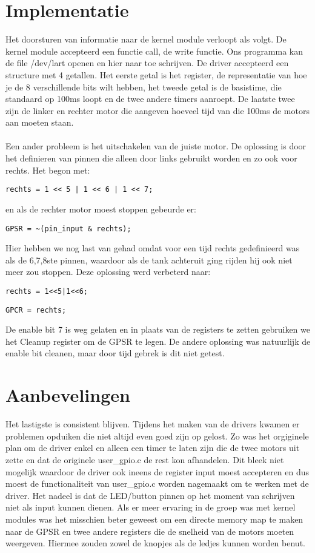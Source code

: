 \documentclass{report}
\begin{document}
\section{Implementatie}
Het doorsturen van informatie naar de kernel module verloopt als volgt. De kernel module accepteerd een functie call, de write functie. Ons programma kan de file /dev/lart openen en hier naar toe schrijven. De driver accepteerd een structure met 4 getallen. Het eerste getal is het register, de representatie van hoe je de 8 verschillende bits wilt hebben, het tweede getal is de basistime, die standaard op 100ms loopt en de twee andere timers aanroept. De laatste twee zijn de linker en rechter motor die aangeven hoeveel tijd van die 100ms de motors aan moeten staan.\\\\
Een ander probleem is het uitschakelen van de juiste motor. De oplossing is door het definieren van pinnen die alleen door links gebruikt worden en zo ook voor rechts. Het begon met:
\begin{lstlisting}
rechts = 1 << 5 | 1 << 6 | 1 << 7;
\end{lstlisting}
en als de rechter motor moest stoppen gebeurde er:
\begin{lstlisting}
GPSR = ~(pin_input & rechts);
\end{lstlisting}
Hier hebben we nog last van gehad omdat voor een tijd rechts gedefinieerd was als de 6,7,8ste pinnen, waardoor als de tank achteruit ging rijden hij ook niet meer zou stoppen. Deze oplossing werd verbeterd naar:
\begin{lstlisting}
rechts = 1<<5|1<<6;
\end{lstlisting}
\begin{lstlisting}
GPCR = rechts;
\end{lstlisting}
De enable bit 7 is weg gelaten en in plaats van de registers te zetten gebruiken we het Cleanup
register om de GPSR te legen. De andere oplossing was natuurlijk de enable bit cleanen, maar door tijd gebrek is dit niet getest.

\section{Aanbevelingen}
Het lastigste is consistent blijven. Tijdens het maken van de drivers kwamen er problemen opduiken die niet altijd even goed zijn op gelost. Zo was het orgiginele plan om de driver enkel en alleen een timer te laten zijn die de twee motors uit zette en dat de originele user\_gpio.c de rest kon afhandelen. Dit bleek niet mogelijk waardoor de driver ook ineens de register input moest accepteren en dus moest de functionaliteit van user\_gpio.c worden nagemaakt om te werken met de driver. Het nadeel is dat de LED/button pinnen op het moment van schrijven niet als input kunnen dienen. Als er meer ervaring in de groep was met kernel modules was het misschien beter geweest om een directe memory map te maken naar de GPSR en twee andere registers die de snelheid van de motors moeten weergeven. Hiermee zouden zowel de knopjes als de ledjes kunnen worden benut.
\end{document}
